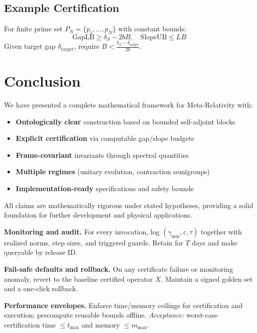 \documentclass[10pt]{article}
\begin{document}
\subsection{Example Certification}

For finite prime set $P_N = \{p_1, \dots, p_N\}$ with constant bounds:
\[
\text{GapLB} \geq \delta_S - 2bB,\quad \text{SlopeUB} \leq LB
\]
Given target gap $\delta_{\text{target}}$, require $B < \frac{\delta_S - \delta_{\text{target}}}{2b}$.

\section{Conclusion}

We have presented a complete mathematical framework for Meta-Relativity with:
\begin{itemize}
    \item \textbf{Ontologically clear} construction based on bounded self-adjoint blocks
    \item \textbf{Explicit certification} via computable gap/slope budgets  
    \item \textbf{Frame-covariant} invariants through spectral quantities
    \item \textbf{Multiple regimes} (unitary evolution, contraction semigroups)
    \item \textbf{Implementation-ready} specifications and safety bounds
\end{itemize}

All claims are mathematically rigorous under stated hypotheses, providing a solid foundation for further development and physical applications.

\appendix


\item \textbf{Monitoring and audit.}\label{g:audit}
For every invocation, log \((\gamma_{\min}, \varepsilon, \tau)\) together with realized norms, step sizes, and triggered guards. Retain for \(T\) days and make queryable by release ID.


\item \textbf{Fail-safe defaults and rollback.}\label{g:rollback}
On any certificate failure or monitoring anomaly, revert to the baseline certified operator \(X\). Maintain a signed golden set and a one-click rollback.


\item \textbf{Performance envelopes.}\label{g:perf}
Enforce time/memory ceilings for certification and execution; precompute reusable bounds offline.
\emph{Acceptance:} worst-case certification time \(\le t_{\max}\) and memory \(\le m_{\max}\).
\end{document}
